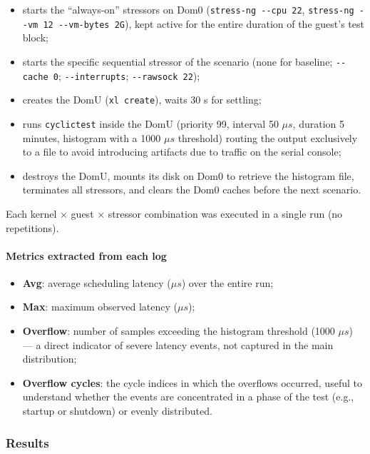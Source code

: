 \begin{itemize}
\item
  starts the ``always-on'' stressors on Dom0
  (\texttt{stress-ng\ -\/-cpu\ 22},
  \texttt{stress-ng\ -\/-vm\ 12\ -\/-vm-bytes\ 2G}), kept active for the
  entire duration of the guest's test block;
\item
  starts the specific sequential stressor of the scenario (none for
  baseline; \texttt{-\/-cache\ 0}; \texttt{-\/-interrupts};
  \texttt{-\/-rawsock\ 22});
\item
  creates the DomU (\texttt{xl\ create}), waits 30 s for settling;
\item
  runs \texttt{cyclictest} inside the DomU (priority 99, interval 50 $\mu s$,
  duration 5 minutes, histogram with a 1000 $\mu s$ threshold) routing the
  output exclusively to a file to avoid introducing artifacts due to
  traffic on the serial console;
\item
  destroys the DomU, mounts its disk on Dom0 to retrieve the histogram
  file, terminates all stressors, and clears the Dom0 caches before the
  next scenario.
\end{itemize}

Each kernel × guest × stressor combination was executed in a single run
(no repetitions).

\paragraph{Metrics extracted from each
log}\label{metrics-extracted-from-each-log}

\begin{itemize}
\item
  \textbf{Avg}: average scheduling latency ($\mu s$) over the entire run;
\item
  \textbf{Max}: maximum observed latency ($\mu s$);
\item
  \textbf{Overflow}: number of samples exceeding the histogram threshold
  (1000 $\mu s$) --- a direct indicator of severe latency events, not
  captured in the main distribution;
\item
  \textbf{Overflow cycles}: the cycle indices in which the overflows
  occurred, useful to understand whether the events are concentrated in
  a phase of the test (e.g., startup or shutdown) or evenly distributed.
\end{itemize}

\subsubsection{Results}\label{results}

